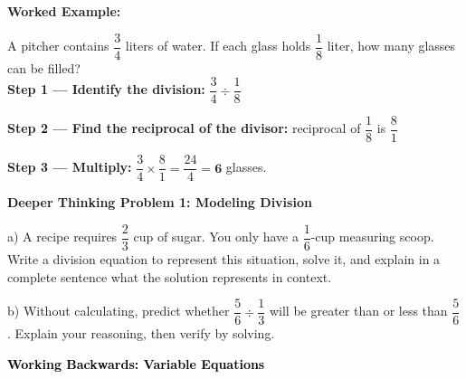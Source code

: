 \documentclass[12pt, letterpaper, fleql]{article}
\begin{document}
\vspace{4mm}

\begin{tcolorbox}[colback=white, colframe=black!25, boxrule=0.6pt, arc=4mm, left=6mm, right=6mm, top=5mm, bottom=5mm]
\textbf{Worked Example:}

\medskip
\noindent
A pitcher contains $\dfrac{3}{4}$ liters of water. If each glass holds $\dfrac{1}{8}$ liter, how many glasses can be filled?\\[4pt]

\vspace{0.8cm}
\textbf{Step 1 — Identify the division:} $\dfrac{3}{4} \div \dfrac{1}{8}$\\[6pt]

\vspace{0.4cm}

\textbf{Step 2 — Find the reciprocal of the divisor:} reciprocal of $\dfrac{1}{8}$ is $\dfrac{8}{1}$\\[6pt]

\vspace{0.4cm}

\textbf{Step 3 — Multiply:} $\dfrac{3}{4} \times \dfrac{8}{1} = \dfrac{24}{4} = \mathbf{6}$ glasses.
\vspace{1cm}
\end{tcolorbox}


\begin{tcolorbox}[colback=white!5, colframe=black, boxrule=1pt, arc=4mm, left=6mm, right=6mm, top=5mm, bottom=5mm]
\textbf{Deeper Thinking Problem 1: Modeling Division}
\medskip

\noindent
a) A recipe requires $\dfrac{2}{3}$ cup of sugar. You only have a $\dfrac{1}{6}$-cup measuring scoop. Write a division equation to represent this situation, solve it, and explain in a complete sentence what the solution represents in context.

\vspace{3cm}

\noindent
b) Without calculating, predict whether $\dfrac{5}{6} \div \dfrac{1}{3}$ will be greater than or less than $\dfrac{5}{6}$. Explain your reasoning, then verify by solving.

\vspace{3cm}
\end{tcolorbox}

\newpage
\begin{tcolorbox}[colback=black!10]
    \large\textcolor{black}{\textbf{Working Backwards: Variable Equations}}
\end{tcolorbox}
\end{document}
